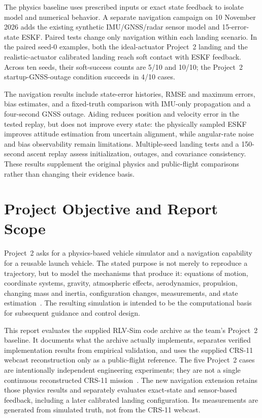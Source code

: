\documentclass[11pt,letterpaper]{article}
\begin{document}
The physics baseline uses prescribed inputs or exact state feedback to isolate model and numerical behavior. A separate navigation campaign on 10 November 2026 adds the existing synthetic IMU/GNSS/radar sensor model and 15-error-state ESKF. Paired tests change only navigation within each landing scenario. In the paired seed-0 examples, both the ideal-actuator Project~2 landing and the realistic-actuator calibrated landing reach soft contact with ESKF feedback. Across ten seeds, their soft-success counts are 5/10 and 10/10; the Project~2 startup-GNSS-outage condition succeeds in 4/10 cases.

The navigation results include state-error histories, RMSE and maximum errors, bias estimates, and a fixed-truth comparison with IMU-only propagation and a four-second GNSS outage. Aiding reduces position and velocity error in the tested replay, but does not improve every state: the physically sampled ESKF improves attitude estimation from uncertain alignment, while angular-rate noise and bias observability remain limitations. Multiple-seed landing tests and a 150-second ascent replay assess initialization, outages, and covariance consistency. These results supplement the original physics and public-flight comparisons rather than changing their evidence basis.

\section{Project Objective and Report Scope}

Project~2 asks for a physics-based vehicle simulator and a navigation capability for a reusable launch vehicle. The stated purpose is not merely to reproduce a trajectory, but to model the mechanisms that produce it: equations of motion, coordinate systems, gravity, atmospheric effects, aerodynamics, propulsion, changing mass and inertia, configuration changes, measurements, and state estimation~\cite{briefing}. The resulting simulation is intended to be the computational basis for subsequent guidance and control design.

This report evaluates the supplied RLV-Sim code archive as the team's Project~2 baseline. It documents what the archive actually implements, separates verified implementation results from empirical validation, and uses the supplied CRS-11 webcast reconstruction only as a public-flight reference. The five Project~2 cases are intentionally independent engineering experiments; they are not a single continuous reconstructed CRS-11 mission~\cite{scenario_spec}. The new navigation extension retains those physics results and separately evaluates exact-state and sensor-based feedback, including a later calibrated landing configuration. Its measurements are generated from simulated truth, not from the CRS-11 webcast.
\end{document}
